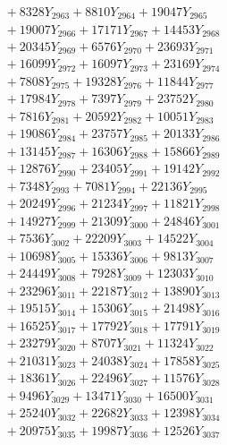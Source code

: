 \documentclass[a4paper,10pt]{article}
\begin{document}
{\begin{align}
&\;  + 8328 Y_{2963} + 8810 Y_{2964} + 19047 Y_{2965} \\[0.3ex]
&\;  + 19007 Y_{2966} + 17171 Y_{2967} + 14453 Y_{2968} \\[0.5ex]\allowbreak
&\;  + 20345 Y_{2969} + 6576 Y_{2970} + 23693 Y_{2971} \\[0.3ex]
&\;  + 16099 Y_{2972} + 16097 Y_{2973} + 23169 Y_{2974} \\[0.3ex]
&\;  + 7808 Y_{2975} + 19328 Y_{2976} + 11844 Y_{2977} \\[0.3ex]
&\;  + 17984 Y_{2978} + 7397 Y_{2979} + 23752 Y_{2980} \\[0.3ex]
&\;  + 7816 Y_{2981} + 20592 Y_{2982} + 10051 Y_{2983} \\[0.3ex]
&\;  + 19086 Y_{2984} + 23757 Y_{2985} + 20133 Y_{2986} \\[0.3ex]
&\;  + 13145 Y_{2987} + 16306 Y_{2988} + 15866 Y_{2989} \\[0.3ex]
&\;  + 12876 Y_{2990} + 23405 Y_{2991} + 19142 Y_{2992} \\[0.3ex]
&\;  + 7348 Y_{2993} + 7081 Y_{2994} + 22136 Y_{2995} \\[0.3ex]
&\;  + 20249 Y_{2996} + 21234 Y_{2997} + 11821 Y_{2998} \\[0.5ex]\allowbreak
&\;  + 14927 Y_{2999} + 21309 Y_{3000} + 24846 Y_{3001} \\[0.3ex]
&\;  + 7536 Y_{3002} + 22209 Y_{3003} + 14522 Y_{3004} \\[0.3ex]
&\;  + 10698 Y_{3005} + 15336 Y_{3006} + 9813 Y_{3007} \\[0.3ex]
&\;  + 24449 Y_{3008} + 7928 Y_{3009} + 12303 Y_{3010} \\[0.3ex]
&\;  + 23296 Y_{3011} + 22187 Y_{3012} + 13890 Y_{3013} \\[0.3ex]
&\;  + 19515 Y_{3014} + 15306 Y_{3015} + 21498 Y_{3016} \\[0.3ex]
&\;  + 16525 Y_{3017} + 17792 Y_{3018} + 17791 Y_{3019} \\[0.3ex]
&\;  + 23279 Y_{3020} + 8707 Y_{3021} + 11324 Y_{3022} \\[0.3ex]
&\;  + 21031 Y_{3023} + 24038 Y_{3024} + 17858 Y_{3025} \\[0.3ex]
&\;  + 18361 Y_{3026} + 22496 Y_{3027} + 11576 Y_{3028} \\[0.5ex]\allowbreak
&\;  + 9496 Y_{3029} + 13471 Y_{3030} + 16500 Y_{3031} \\[0.3ex]
&\;  + 25240 Y_{3032} + 22682 Y_{3033} + 12398 Y_{3034} \\[0.3ex]
&\;  + 20975 Y_{3035} + 19987 Y_{3036} + 12526 Y_{3037} \\[0.3ex]

\end{align}}
\end{document}
